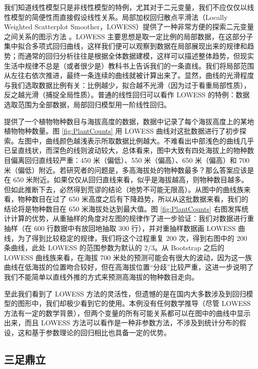 \documentclass[
  b5paper,
  UTF8,twoside]{book}
\begin{document}
我们知道线性模型只是非线性模型的特例，尤其对于二元变量，我们不应仅仅以线性模型的简便性而直接假设线性关系。局部加权回归散点平滑法（Locally Weighted Scatterplot Smoother，LOWESS）提供了一种非常方便的探索二元变量之间关系的图示方法 \citep{Cleveland79}。LOWESS 主要思想是取一定比例的局部数据，在这部分子集中拟合多项式回归曲线，这样我们便可以观察到数据在局部展现出来的规律和趋势；而通常的回归分析往往是根据全体数据建模，这样可以描述整体趋势，但现实生活中规律不总是（或者很少是）教科书上告诉我们的一条直线。我们将局部范围从左往右依次推进，最终一条连续的曲线就被计算出来了。显然，曲线的光滑程度与我们选取数据比例有关：比例越少，拟合越不光滑（因为过于看重局部性质），反之越光滑（捕捉全局性质）。普通的线性回归可以看作 LOWESS 的特例：数据选取范围为全部数据，局部回归模型用一阶线性回归。

\citet{Xie08LOWESS} 提供了一个植物物种数目与海拔高度的数据，数据中记录了每个海拔高度上的某地植物物种数量。图 \ref{fig:PlantCounts} 用 LOWESS 曲线对这批数据进行了初步探索。左图中，曲线颜色越浅表示所取数据比例越大。不难看出中部浅色的曲线几乎已呈直线状，而深色的线则波动较大，总体看来，图中大致有四处海拔上的物种数目偏离回归直线较严重：450 米（偏低）、550 米（偏高）、650 米（偏高）和 700 米（偏低）附近。若研究者的问题是，多高海拔处的物种数最多？那么答案应该是在 650 米附近。如果仅仅从回归直线来看，似乎是海拔越高，则物种数目越多。但如此推断下去，必然得到荒谬的结论（地势不可能无限高）。从图中的曲线族来看，物种数目在过了 650 米高度之后有下降趋势，所以从这批数据来看，我们的结论将是物种数目在 650 米海拔处达到最大值。图 \ref{fig:PlantCounts} 右图发挥统计计算的优势，从重抽样的角度对左图的规律作了进一步验证：我们对数据进行重抽样（在 600 行数据中有放回地抽取 300 行），并对重抽样数据画 LOWESS 曲线，为了得到比较稳定的规律，我们将这个过程重复 200 次，得到右图中的 200 条曲线，此处 LOWESS 的范围参数为默认的 2/3。从 Bootstrap 之后的 LOWESS 曲线族来看，在海拔 700 米处的预测可能会有很大的波动，因为这一族曲线在低海拔的位置吻合较好，但在高海拔位置``分歧''比较严重，这进一步说明了我们不能简单以直线外推的方式来预测高海拔的物种数目走向。

至此我们看到了 LOWESS 方法的灵活性，但遗憾的是在国内大多数涉及到回归模型的图形中，我们却极少看到它的使用。本例没有任何数学推导（尽管 LOWESS 方法有一定的数学背景），但两个变量的所有可能关系都可以在图中的曲线中显示出来，而且 LOWESS 方法可以看作是一种非参数方法，不涉及到统计分布的假设，这和基于参数理论的回归相比也具备一定的优势。

\hypertarget{subsec:ternary}{%
\subsection{三足鼎立}\label{subsec:ternary}}
\end{document}
